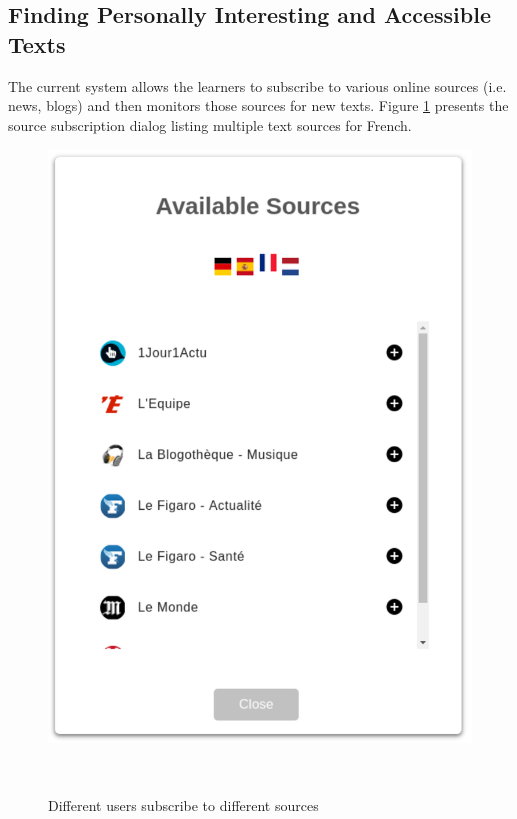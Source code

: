 


  

\subsection{Finding Personally Interesting and Accessible Texts}
The current system allows the learners to subscribe to various online sources (i.e. news, blogs) and then monitors those sources for new texts. Figure \ref{fig:system_subscriptions} presents the source subscription dialog listing multiple text sources for French.



    \begin{figure}[h!]
    \centering
      \includegraphics[width=0.4\columnwidth]{figures/available_sources}
      \caption{Different users subscribe to different sources}~\label{fig:system_subscriptions}
    \end{figure}

